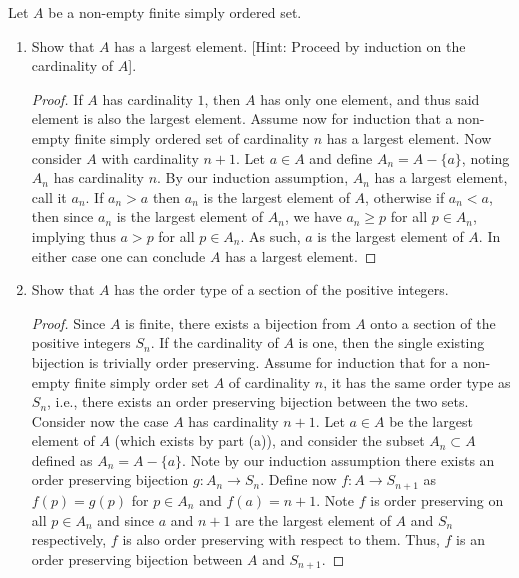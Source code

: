 \documentclass[12pt]{article}
\begin{document}
     Let $A$ be a non-empty finite simply ordered set.
    \begin{enumerate}[label=(\alph*)]
        \item Show that $A$ has a largest element. [Hint: Proceed by induction
        on the cardinality of $A$].
        \begin{proof}
            If $A$ has cardinality $1$, then $A$ has only one element,
            and thus said element is also the largest element. Assume now
            for induction that a non-empty finite simply ordered set of cardinality $n$ has a largest
            element. Now consider $A$ with cardinality $n + 1$. 
            Let $a \in A$ and define $A_n = A - \{a\}$, noting $A_n$ has
            cardinality $n$. By our induction assumption, $A_n$ has a largest
            element, call it $a_n$. If $a_n > a$ then $a_n$ is the largest
            element of $A$, otherwise if $a_n < a$, then since $a_n$
            is the largest element of $A_n$, we have $a_n \geq p$ for all
            $p \in A_n$, implying thus $a > p$ for all $p \in A_n$.
            As such, $a$ is the largest element of $A$. In either case 
            one can conclude $A$ has a largest element.
        \end{proof}
        \item Show that $A$ has the order type of a section of the positive
        integers.
        \begin{proof}
            Since $A$ is finite, there exists a bijection from $A$ 
            onto a section of the positive integers $S_n$.
            If the cardinality of $A$ is one, then the single existing
            bijection is trivially order preserving.
            Assume for induction that for a non-empty finite simply order set $A$
            of cardinality $n$, it has the same order type as $S_n$, i.e.,
            there exists an order preserving bijection between the two sets.
            Consider now the case $A$ has cardinality $n + 1$. 
            Let $a \in A$ be the largest element of $A$ (which exists by part (a)), 
            and consider the subset $A_n \subset A$
            defined as $A_n = A - \{a\}$. Note by our induction assumption
            there exists an order preserving bijection $g: A_n \to S_n$.
            Define now $f: A \to S_{n+1}$ as $f(p) = g(p)$ for $p \in A_n$
            and $f(a) = n + 1$. Note $f$ is order preserving on all $p \in A_n$
            and since $a$ and $n + 1$ are the largest element of $A$ and
            $S_n$ respectively, $f$ is also order preserving with respect to
            them. Thus, $f$ is an order preserving bijection between
            $A$ and $S_{n+1}$.
        \end{proof} 
    \end{enumerate}
\end{document}
